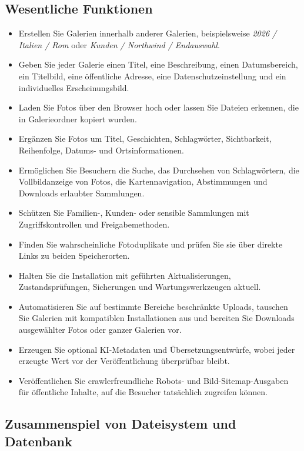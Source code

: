 \documentclass[11pt,a4paper]{article}
\begin{document}
\subsection{Wesentliche Funktionen}

\begin{itemize}
  \item Erstellen Sie Galerien innerhalb anderer Galerien, beispielsweise
  \emph{2026 / Italien / Rom} oder \emph{Kunden / Northwind / Endauswahl}.
  \item Geben Sie jeder Galerie einen Titel, eine Beschreibung, einen
  Datumsbereich, ein Titelbild, eine öffentliche Adresse, eine
  Datenschutzeinstellung und ein individuelles Erscheinungsbild.
  \item Laden Sie Fotos über den Browser hoch oder lassen Sie Dateien erkennen,
  die in Galerieordner kopiert wurden.
  \item Ergänzen Sie Fotos um Titel, Geschichten, Schlagwörter, Sichtbarkeit,
  Reihenfolge, Datums- und Ortsinformationen.
  \item Ermöglichen Sie Besuchern die Suche, das Durchsehen von Schlagwörtern,
  die Vollbildanzeige von Fotos, die Kartennavigation, Abstimmungen und
  Downloads erlaubter Sammlungen.
  \item Schützen Sie Familien-, Kunden- oder sensible Sammlungen mit
  Zugriffskontrollen und Freigabemethoden.
  \item Finden Sie wahrscheinliche Fotoduplikate und prüfen Sie sie über direkte
  Links zu beiden Speicherorten.
  \item Halten Sie die Installation mit geführten Aktualisierungen,
  Zustandsprüfungen, Sicherungen und Wartungswerkzeugen aktuell.
  \item Automatisieren Sie auf bestimmte Bereiche beschränkte Uploads, tauschen
  Sie Galerien mit kompatiblen Installationen aus und bereiten Sie Downloads
  ausgewählter Fotos oder ganzer Galerien vor.
  \item Erzeugen Sie optional KI-Metadaten und Übersetzungsentwürfe, wobei jeder
  erzeugte Wert vor der Veröffentlichung überprüfbar bleibt.
  \item Veröffentlichen Sie crawlerfreundliche Robots- und Bild-Sitemap-Ausgaben
  für öffentliche Inhalte, auf die Besucher tatsächlich zugreifen können.
\end{itemize}

\subsection{Zusammenspiel von Dateisystem und Datenbank}
\end{document}
